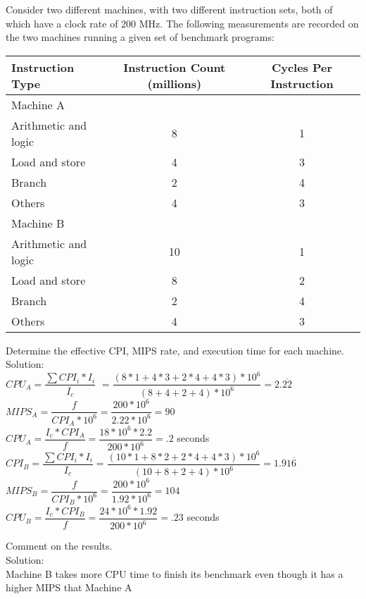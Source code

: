 \documentclass[12pt,largemargins]{homework}
\date{Septemeber 6, 2018}
\begin{document}
\maketitle
\normalsize
	 Consider two different machines, with two different instruction sets, both of which
have a clock rate of 200 MHz. The following measurements are recorded on the two
machines running a given set of benchmark programs: \\
	\begin{tabular}{|l|c|c|}
		\hline
		Instruction Type & Instruction Count (millions) & Cycles Per Instruction \\
		\hline 
		Machine A & & \\
	     Arithmetic and logic & 8 & 1 \\
	     Load and store & 4 & 3 \\
	     Branch & 2 & 4 \\
	     Others & 4 & 3\\
	     \hline
	     Machine B & & \\
	     Arithmetic and logic & 10 & 1 \\
	     Load and store & 8 & 2  \\
		 Branch & 2 & 4 \\
	     Others & 4 & 3\\
	     \hline
	     
	\end{tabular}
		\begin{alphaparts}

	\item 
	Determine the effective CPI, MIPS rate, and execution time for each machine. \\		     		Solution: \\
	$CPU_A =\dfrac{\sum CPI_i * I_i}{I_c}$
	$= \dfrac{(8*1 +4 *3 + 2*4 + 4*3)*10^6}{(8+4+2+4)*10^6} = 2.\overline{22}$\\
	$MIPS_A=\dfrac{f}{CPI_A*10^6} = \dfrac{200*10^6}{2.22*10^6} = 90$ \\
	$CPU_A=\dfrac{I_c*CPI_A}{f}=\dfrac{18*10^6*2.2}{200*10^6} =.2$ seconds\\
	$CPI_B=\dfrac{\sum CPI_i * I_i}{I_c} 
	= \dfrac{(10*1+8*2+2*4+4*3)*10^6}{(10+8+2+4)*10^6} = 1.91\overline{6}$ \\
	$MIPS_B = \dfrac{f}{CPI_B*10^6} =\dfrac{200*10^6}{1.92*10^6} = 104$ \\
	$CPU_B=\dfrac{I_c*CPI_B}{f}=\dfrac{24*10^6*1.92}{200*10^6} = .23$ seconds
	\item 
	Comment on the results.\\
	Solution: \\
	Machine B takes more CPU time to finish its benchmark even though it has a higher MIPS that Machine A

	\end{alphaparts}
\end{document}
